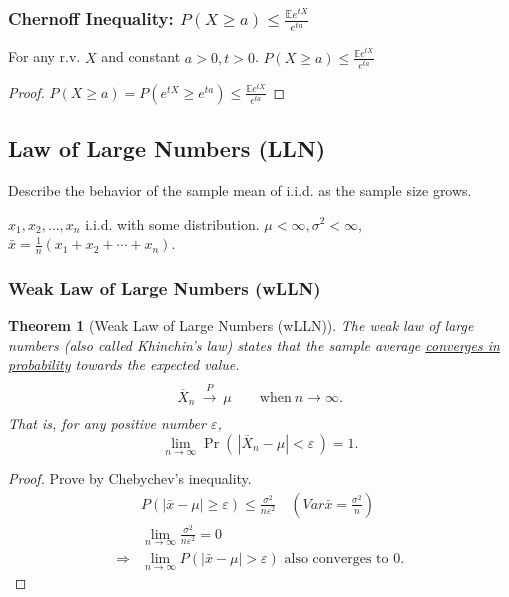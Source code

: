 \documentclass[11pt,a4paper]{article}
\newtheorem{theorem}{Theorem}
\begin{document}
\subsubsection{Chernoff Inequality: $P(X\geq a)\leq \frac{\mathbb{E}e^{tX}}{e^{ta}}$}
For any r.v. $X$ and constant $a>0,t>0$. $P(X\geq a)\leq \frac{\mathbb{E}e^{tX}}{e^{ta}}$
\begin{proof}
$P(X\geq a)=P(e^{tX}\geq e^{ta})\leq \frac{\mathbb{E}e^{tX}}{e^{ta}}$
\end{proof}

\subsection{Law of Large Numbers (LLN)}
Describe the behavior of the sample mean of i.i.d. as the sample size grows.

$x_{1}, x_{2}, \ldots, x_{n}$ i.i.d. with some distribution. $\mu<\infty,\sigma^{2}<\infty$,$\bar{x}=\frac{1}{n}\left(x_{1}+x_{2}+\cdots+x_{n}\right)$.
\subsubsection{Weak Law of Large Numbers (wLLN)}
\begin{theorem}[Weak Law of Large Numbers (wLLN)]
    The weak law of large numbers (also called Khinchin's law) states that the sample average \underline{converges in probability} towards the expected value.
    $${\displaystyle {\begin{matrix}{}\\{\overline {X}}_{n}\ {\xrightarrow {P}}\ \mu \qquad {\text{when}}\ n\to \infty .\\{}\end{matrix}}}$$
    That is, for any positive number $\varepsilon$,
    $${\displaystyle \lim _{n\to \infty }\Pr \!\left(\,|{\overline {X}}_{n}-\mu |<\varepsilon \,\right)=1.}$$
\end{theorem}
\begin{proof}
Prove by Chebychev's inequality.
$$
\begin{aligned}
&P(|\bar{x}-\mu|\geq\varepsilon) \leq \frac{\sigma^{2}}{n \varepsilon^{2}} \quad (Var\bar{x}=\frac{\sigma^{2}}{n}) \\
&\lim_{n \rightarrow \infty}\frac{\sigma^{2}}{n \varepsilon^{2}}=0\\
\Rightarrow&\lim_{n \rightarrow \infty}P(|\bar{x}-\mu|>\varepsilon) \text { also converges to } 0 .
\end{aligned}
$$
\end{proof}
\end{document}
